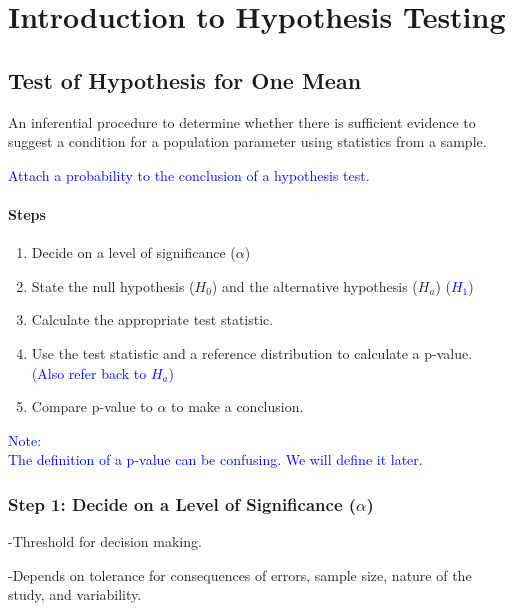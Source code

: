 \setcounter{chapter}{10}  %

\chapter{Introduction to Hypothesis Testing}
\label{ch:intro-hypothesis}

\section{Test of Hypothesis for One Mean}

\begin{definition}
An inferential procedure to determine whether there is sufficient evidence to suggest a condition for a population parameter using statistics from a sample.
\end{definition}


\textcolor{blue}{Attach a probability to the conclusion of a hypothesis test.}

\subsubsection*{Steps}
\begin{enumerate}
    \item Decide on a level of significance ($\alpha$)
    \item State the null hypothesis ($H_0$) and the alternative hypothesis ($H_a$) \textcolor{blue}{($H_1$)}
    \item Calculate the appropriate test statistic.
    \item Use the test statistic and a reference distribution to calculate a p-value. \\
    \textcolor{blue}{(Also refer back to $H_a$)}
    \item Compare p-value to $\alpha$ to make a conclusion.
\end{enumerate}

\textcolor{blue}{Note:} \\
\textcolor{blue}{The definition of a p-value can be confusing. We will define it later.}

\subsection*{Step 1: Decide on a Level of Significance ($\alpha$)}
-Threshold for decision making.

-Depends on tolerance for consequences of errors, sample size, nature of the study, and variability.


